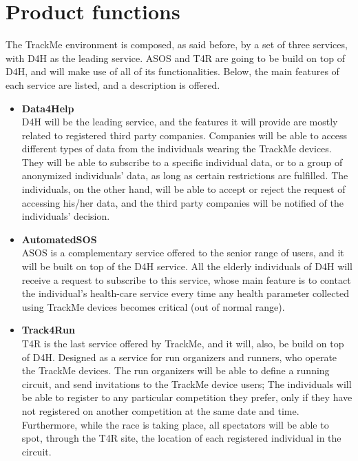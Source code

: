 \documentclass[a4paper, hidelinks, 12pt]{report}
\begin{document}
	\section{Product functions}
	The TrackMe environment is composed, as said before, by a set of three services, with D4H as the leading service. ASOS and T4R are going to be build on top of D4H, and will make use of all of its functionalities. Below, the main features of each service are listed, and a description is offered.
	
	\begin{itemize}
		\item{\textbf{Data4Help}}
		\\D4H will be the leading service, and the features it will provide are mostly related to registered third party companies. Companies will be able to access different types of data from the individuals wearing the TrackMe devices. They will be able to subscribe to a specific individual data, or to a group of anonymized individuals' data, as long as certain restrictions are fulfilled. The individuals, on the other hand, will be able to accept or reject the request of accessing his/her data, and the third party companies will be notified of the individuals' decision.
		
		\item{\textbf{AutomatedSOS}}
		\\ ASOS is a complementary service offered to the senior range of users, and it will be built on top of the D4H service. All the elderly individuals of D4H will receive a request to subscribe to this service, whose main feature is to contact the individual's health-care service every time any health parameter collected using TrackMe devices becomes critical (out of normal range).
		
		\item{\textbf{Track4Run}}
		\\T4R is the last service offered by TrackMe, and it will, also, be build on top of D4H. Designed as a service for run organizers and runners, who operate the TrackMe devices. The run organizers will be able to define a running circuit, and send invitations to the TrackMe device users; The individuals will be able to register to any particular competition they prefer, only if they have not registered on another competition at the same date and time. Furthermore, while the race is taking place, all spectators will be able to spot, through the T4R site, the location of each registered individual in the circuit.
	\end{itemize}
	
\end{document}
